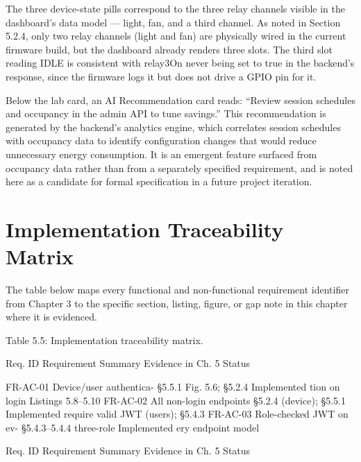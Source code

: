 The three device-state pills correspond to the three relay channels visible in the dashboard's data model --- light, fan, and a third channel. As noted in Section 5.2.4, only
two relay channels (light and fan) are physically wired in the current ﬁrmware build, but
the dashboard already renders three slots. The third slot reading IDLE is consistent with
relay3On never being set to true in the backend's response, since the ﬁrmware logs it but
does not drive a GPIO pin for it.

Below the lab card, an AI Recommendation card reads: ``Review session schedules
and occupancy in the admin API to tune savings.'' This recommendation is generated by
the backend's analytics engine, which correlates session schedules with occupancy data to
identify conﬁguration changes that would reduce unnecessary energy consumption. It is
an emergent feature surfaced from occupancy data rather than from a separately speciﬁed
requirement, and is noted here as a candidate for formal speciﬁcation in a future project
iteration.



\section{Implementation Traceability Matrix}


The table below maps every functional and non-functional requirement identiﬁer from
Chapter 3 to the speciﬁc section, listing, ﬁgure, or gap note in this chapter where it is
evidenced.

Table 5.5: Implementation traceability matrix.


Req. ID Requirement Summary Evidence in Ch. 5 Status

FR-AC-01 Device/user authentica- §5.5.1 Fig. 5.6; §5.2.4 Implemented
tion on login Listings 5.8--5.10
FR-AC-02 All non-login endpoints §5.2.4 (device); §5.5.1 Implemented
require valid JWT (users); §5.4.3
FR-AC-03 Role-checked JWT on ev- §5.4.3--5.4.4 three-role Implemented
ery endpoint model







Req. ID Requirement Summary Evidence in Ch. 5 Status


